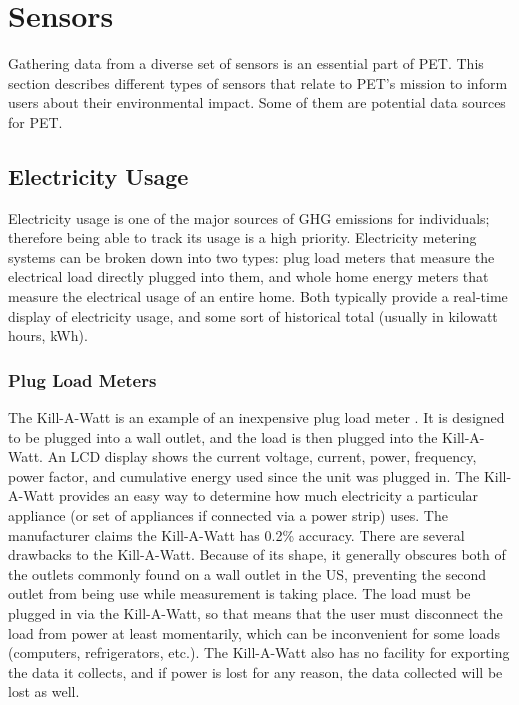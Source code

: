 \section{Sensors}
\label{sec:sensors}

Gathering data from a diverse set of sensors is an essential part of PET. This section describes different types of sensors that relate to PET's mission to inform users about their environmental impact. Some of them are potential data sources for PET.

\subsection{Electricity Usage}

Electricity usage is one of the major sources of GHG emissions for individuals; therefore being able to track its usage is a high priority. Electricity metering systems can be broken down into two types: plug load meters that measure the electrical load directly plugged into them, and whole home energy meters that measure the electrical usage of an entire home. Both typically provide a real-time display of electricity usage, and some sort of historical total (usually in kilowatt hours, kWh).

\subsubsection{Plug Load Meters}
\label{sec:plug-load-meters}

The Kill-A-Watt is an example of an inexpensive plug load meter \cite{kill-a-watt}. It is designed to be plugged into a wall outlet, and the load is then plugged into the Kill-A-Watt. An LCD display shows the current voltage, current, power, frequency, power factor, and cumulative energy used since the unit was plugged in. The Kill-A-Watt provides an easy way to determine how much electricity a particular appliance (or set of appliances if connected via a power strip) uses. The manufacturer claims the Kill-A-Watt has 0.2\% accuracy. There are several drawbacks to the Kill-A-Watt. Because of its shape, it generally obscures both of the outlets commonly found on a wall outlet in the US, preventing the second outlet from being use while measurement is taking place. The load must be plugged in via the Kill-A-Watt, so that means that the user must disconnect the load from power at least momentarily, which can be inconvenient for some loads (computers, refrigerators, etc.). The Kill-A-Watt also has no facility for exporting the data it collects, and if power is lost for any reason, the data collected will be lost as well.

